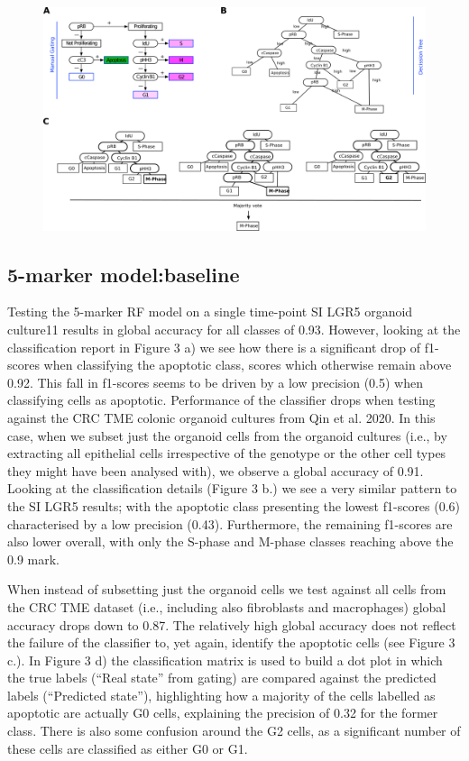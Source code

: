 \begin{figure}
    \centering
    \includegraphics{03cytof/figs/3CLASS_stateRF.png}
    \caption{}
    \label{fig:3classover}
\end{figure}

\subsection{5-marker model:baseline}

Testing the 5-marker RF model on a single time-point SI LGR5 organoid culture11 results in global accuracy for all classes of 0.93. However, looking at the classification report in Figure 3 a) we see how there is a significant drop of f1-scores when classifying the apoptotic class, scores which otherwise remain above 0.92. This fall in f1-scores seems to be driven by a low precision (0.5) when classifying cells as apoptotic.
Performance of the classifier drops when testing against the CRC TME colonic organoid cultures from Qin et al. 2020. In this case, when we subset just the organoid cells from the organoid cultures (i.e., by extracting all epithelial cells irrespective of the genotype or the other cell types they might have been analysed with), we observe a global accuracy of 0.91. Looking at the classification details (Figure 3 b.) we see a very similar pattern to the SI LGR5 results; with the apoptotic class presenting the lowest f1-scores (0.6) characterised by a low precision (0.43). Furthermore, the remaining f1-scores are also lower overall, with only the S-phase and M-phase classes reaching above the 0.9 mark.

When instead of subsetting just the organoid cells we test against all cells from the CRC TME dataset (i.e., including also fibroblasts and macrophages) global accuracy drops down to 0.87. The relatively high global accuracy does not reflect the failure of the classifier to, yet again, identify the apoptotic cells (see Figure 3 c.). In Figure 3 d) the classification matrix is used to build a dot plot in which the true labels (“Real state” from gating) are compared against the predicted labels (“Predicted state”), highlighting how a majority of the cells labelled as apoptotic are actually G0 cells, explaining the precision of 0.32 for the former class. There is also some confusion around the G2 cells, as a significant number of these cells are classified as either G0 or G1.

